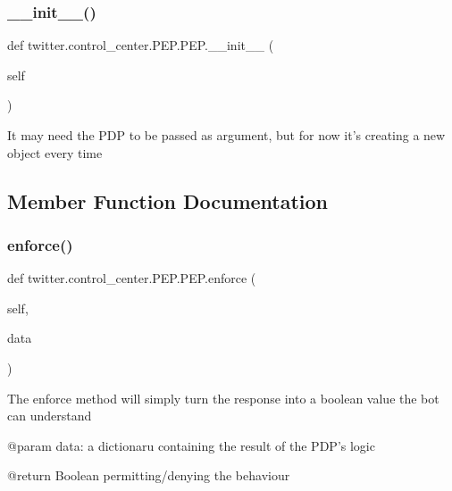 \subsubsection{\texorpdfstring{\+\_\+\+\_\+init\+\_\+\+\_\+()}{\_\_init\_\_()}}
{\footnotesize\ttfamily def twitter.\+control\+\_\+center.\+P\+E\+P.\+P\+E\+P.\+\_\+\+\_\+init\+\_\+\+\_\+ (\begin{DoxyParamCaption}\item[{}]{self }\end{DoxyParamCaption})}

\begin{DoxyVerb}It may need the PDP to be passed as argument, but for now it's creating a new object every time
\end{DoxyVerb}
 

\subsection{Member Function Documentation}
\mbox{\label{classtwitter_1_1control__center_1_1PEP_1_1PEP_ad3d661b529e2bd004eda5e3746dab298}} 
\subsubsection{\texorpdfstring{enforce()}{enforce()}}
{\footnotesize\ttfamily def twitter.\+control\+\_\+center.\+P\+E\+P.\+P\+E\+P.\+enforce (\begin{DoxyParamCaption}\item[{}]{self,  }\item[{}]{data }\end{DoxyParamCaption})}

\begin{DoxyVerb}The enforce method will simply turn the response into a boolean value the bot can understand

@param data: a dictionaru containing the result of the PDP's logic

@return Boolean permitting/denying the behaviour
\end{DoxyVerb}
 \mbox{\label{classtwitter_1_1control__center_1_1PEP_1_1PEP_af13289593fcd0c6d2e945b9431642120}} 
